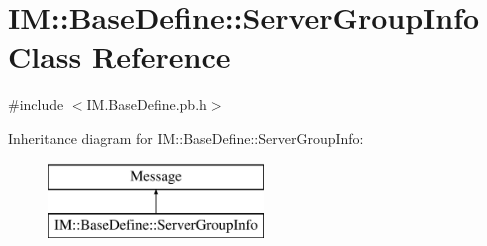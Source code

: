 \hypertarget{class_i_m_1_1_base_define_1_1_server_group_info}{}\section{I\+M\+:\+:Base\+Define\+:\+:Server\+Group\+Info Class Reference}
\label{class_i_m_1_1_base_define_1_1_server_group_info}


{\ttfamily \#include $<$I\+M.\+Base\+Define.\+pb.\+h$>$}

Inheritance diagram for I\+M\+:\+:Base\+Define\+:\+:Server\+Group\+Info\+:\begin{figure}[H]
\begin{center}
\leavevmode
\includegraphics[height=2.000000cm]{class_i_m_1_1_base_define_1_1_server_group_info}
\end{center}
\end{figure}
